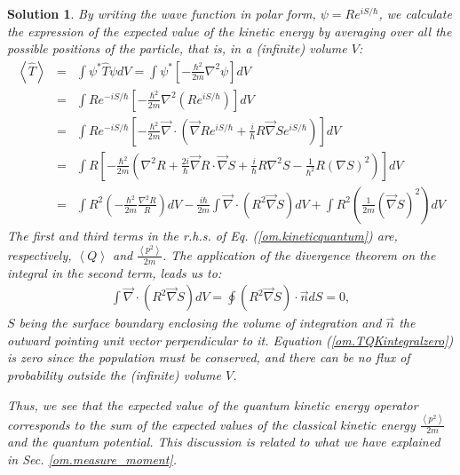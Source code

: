 \documentclass[onecolumn,nofootinbib, secnumarabic, amsmath, nobibnotes,11pt,aps,pra]{revtex4-1}
\newtheorem{solution}{Solution}
\newcommand{\sref}[1]{Sec. \ref{#1}}
\newcommand{\eref}[1]{Eq. (\ref{#1})}
\newcommand{\Eref}[1]{Equation (\ref{#1})}
\begin{document}
\begin{solution}

By writing the wave function in polar form, $\psi = R e^{iS/\hbar}$, we calculate the expression of the expected value of the kinetic energy by averaging over all the possible positions of the particle, that is, in a (infinite) volume $V$:
\begin{eqnarray}
\left\langle \hat{T} \right\rangle &=& \int \psi^* \hat{T} \psi dV = \int \psi^* \left[-\frac{\hbar^2}{2m} \nabla^2 \psi \right] dV \\
&=& \int R e^{-iS/\hbar} \left[-\frac{\hbar^2}{2m} \nabla^2 (R e^{iS/\hbar}) \right] dV \\
&=& \int R e^{-iS/\hbar} \left[-\frac{\hbar^2}{2m} \vec{\nabla} \cdot \left( \vec{\nabla} R e^{iS/\hbar} + \frac{i}{\hbar} R \vec{\nabla} S e^{iS/\hbar} \right) \right] dV \\
&=& \int R \!\left[-\frac{\hbar^2}{2m}\! \left(\! \nabla^2 R +
\frac{2i}{\hbar} \vec{\nabla} R \cdot \vec{\nabla} S + \frac{i}{\hbar} R \nabla^2 S - \frac{1}{\hbar^2} R (\nabla S)^2 \!\right)\! \right] dV \\
&=& \int R^2 \left(-\frac{\hbar^2}{2m} \frac{\nabla^2 R}{R} \right)
dV - \frac{i \hbar}{2m} \int \vec{\nabla} \cdot \left( R^2
\vec{\nabla} S\right) dV + \int R^2 \left( \frac{1}{2m} (\vec{\nabla} S)^2 \right) dV
\label{om.kineticquantum}
\end{eqnarray}
The first and third terms in the r.h.s. of \eref{om.kineticquantum} are, respectively, $\left\langle Q \right\rangle$ and $\frac{\left\langle p^2 \right\rangle}{2m}$. The application of the divergence theorem on the integral in the second term, leads us to:
\begin{eqnarray}
\int \vec{\nabla} \cdot \left( R^2 \vec{\nabla} S\right) dV = \oint \left( R^2 \vec{\nabla} S \right) \cdot \vec{n} dS = 0, \label{om.TQKintegralzero}
\end{eqnarray}
$S$ being the surface boundary enclosing the volume of integration
and $\vec{n}$ the outward pointing unit vector perpendicular to it.
\Eref{om.TQKintegralzero} is zero since the population must be
conserved, and there can be no flux of probability outside the
(infinite) volume $V$.

Thus, we see that the expected value of the quantum kinetic energy operator corresponds to the sum of the expected values of the classical kinetic energy $\frac{\left\langle p^2 \right\rangle}{2m}$ and the quantum potential. This discussion is related to what we have explained in \sref{om.measure_moment}.

\end{solution}
\end{document}
